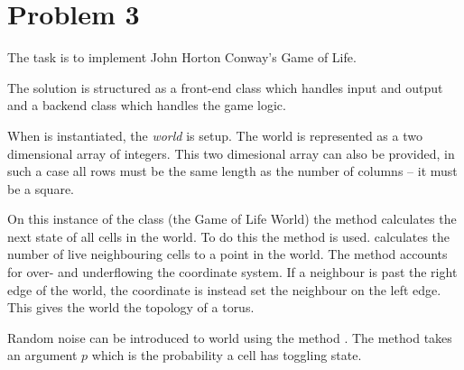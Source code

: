 \section*{Problem 3}

The task is to implement John Horton Conway's Game of Life.

The solution is structured as a front-end class  which
handles input and output and a backend class  which handles
the game logic.

When  is instantiated, the \emph{world} is setup. The world
is represented as a two dimensional array of integers. This two dimesional
array can also be provided, in such a case all rows must be the same length as
the number of columns -- it must be a square.

On this instance of the class (the Game of Life World) the method
 calculates the next state of all cells in the world. To do
this the method  is used. 
calculates the number of live neighbouring cells to a point in the world. The
method accounts for over- and underflowing the coordinate system. If a
neighbour is past the right edge of the world, the coordinate is instead set
the neighbour on the left edge. This gives the world the topology of a torus.

Random noise can be introduced to world using the method .
The method takes an argument $p$ which is the probability a cell has toggling
state. 
